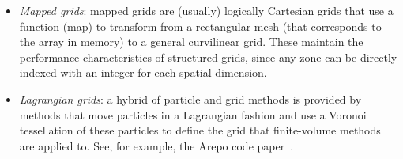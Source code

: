 \begin{itemize}
\item {\em Mapped grids}: mapped grids are (usually) logically
  Cartesian grids that use a function (map) to transform from 
  a rectangular mesh (that corresponds to the array in memory)
  to a general curvilinear grid.  These maintain the performance
  characteristics of structured grids, since any zone can be 
  directly indexed with an integer for each spatial dimension. 

\item {\em Lagrangian grids}: a hybrid of particle and grid methods is
  provided by methods that move particles in a Lagrangian fashion and
  use a Voronoi tessellation of these particles to define the grid
  that finite-volume methods are applied to.  See, for example,
  the Arepo code paper~\cite{arepo}.
\end{itemize}
